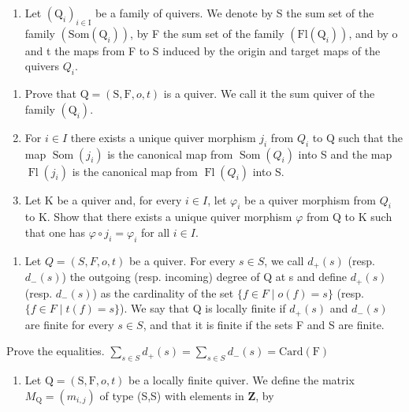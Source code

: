 \exercisegroup

\begin{enumerate}
\def\labelenumi{\arabic{enumi})}
\tightlist
\item
  Let \((\mathrm{Q}_{i})_{i\in\mathrm{I}}\) be a family of quivers. We denote by S the sum set of the family \((\mathrm{Som}(\mathrm{Q}_{i}))\), by F the sum set of the family \((\mathrm{Fl}(\mathrm{Q}_{i}))\), and by o and t the maps from F to S induced by the origin and target maps of the quivers \(Q_{i}\).
\end{enumerate}

\begin{enumerate}
\def\labelenumi{\alph{enumi})}
\item
  Prove that \(\mathrm{Q} = (\mathrm{S}, \mathrm{F}, o, t)\) is a quiver. We call it the sum quiver of the family \((\mathrm{Q}_{i})\).
\item
  For \(i \in I\) there exists a unique quiver morphism \(j_{i}\) from \(Q_{i}\) to Q such that the map \(\operatorname{Som}(j_{i})\) is the canonical map from \(\operatorname{Som}(Q_{i})\) into S and the map \(\operatorname{Fl}(j_{i})\) is the canonical map from \(\operatorname{Fl}(Q_{i})\) into S.
\item
  Let K be a quiver and, for every \(i \in I\), let \(\varphi_{i}\) be a quiver morphism from \(Q_{i}\) to K. Show that there exists a unique quiver morphism \(\varphi\) from Q to K such that one has \(\varphi \circ j_{i} = \varphi_{i}\) for all \(i \in I\).
\end{enumerate}

\begin{enumerate}
\def\labelenumi{\arabic{enumi})}
\setcounter{enumi}{1}
\tightlist
\item
  Let \(Q = (S, F, o, t)\) be a quiver. For every \(s \in S\), we call \(d_{+}(s)\) (resp. \(d_{-}(s)\)) the outgoing (resp. incoming) degree of Q at s and define \(d_{+}(s)\) (resp. \(d_{-}(s)\)) as the cardinality of the set \(\{f \in F \mid o(f) = s\}\) (resp. \(\{f \in F \mid t(f) = s\}\)). We say that Q is locally finite if \(d_{+}(s)\) and \(d_{-}(s)\) are finite for every \(s \in S\), and that it is finite if the sets F and S are finite.
\end{enumerate}

Prove the equalities. \(\sum_{s\in S}d_{+}(s) = \sum_{s\in S}d_{-}(s) = \mathrm{Card}(\mathrm{F})\)

\begin{enumerate}
\def\labelenumi{\arabic{enumi})}
\setcounter{enumi}{2}
\tightlist
\item
  Let \(\mathrm{Q} = (\mathrm{S},\mathrm{F},o,t)\) be a locally finite quiver. We define the matrix \(M_{\mathrm{Q}} = (m_{i,j})\) of type (S,S) with elements in \(\mathbf{Z}\), by
\end{enumerate}

